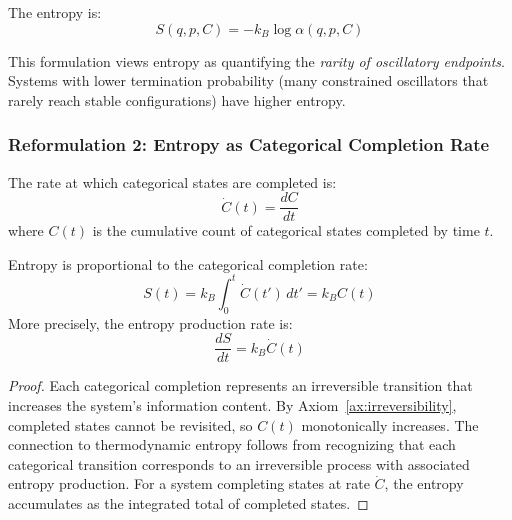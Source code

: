\begin{definition}
\label{def:entropy}
The entropy is:
\begin{equation}
S(q,p,C) = -k_B \log \alpha(q,p,C)
\label{eq:oscillatory_entropy}
\end{equation}
\end{definition}

This formulation views entropy as quantifying the \emph{rarity of oscillatory endpoints}. Systems with lower termination probability (many constrained oscillators that rarely reach stable configurations) have higher entropy.

\subsubsection{Reformulation 2: Entropy as Categorical Completion Rate}

\begin{definition}
\label{def:completion_rate}
The rate at which categorical states are completed is:
\begin{equation}
\dot{C}(t) = \frac{dC}{dt}
\label{eq:completion_rate}
\end{equation}
where $C(t)$ is the cumulative count of categorical states completed by time $t$.
\end{definition}

\begin{theorem}
\label{thm:entropy_rate}
Entropy is proportional to the categorical completion rate:
\begin{equation}
S(t) = k_B \int_0^t \dot{C}(t') \, dt' = k_B C(t)
\label{eq:entropy_completion_rate}
\end{equation}
More precisely, the entropy production rate is:
\begin{equation}
\frac{dS}{dt} = k_B \dot{C}(t)
\label{eq:entropy_production_rate}
\end{equation}
\end{theorem}

\begin{proof}
Each categorical completion represents an irreversible transition that increases the system's information content. By Axiom~\ref{ax:irreversibility}, completed states cannot be revisited, so $C(t)$ monotonically increases. The connection to thermodynamic entropy follows from recognizing that each categorical transition corresponds to an irreversible process with associated entropy production. For a system completing states at rate $\dot{C}$, the entropy accumulates as the integrated total of completed states.
\end{proof}

